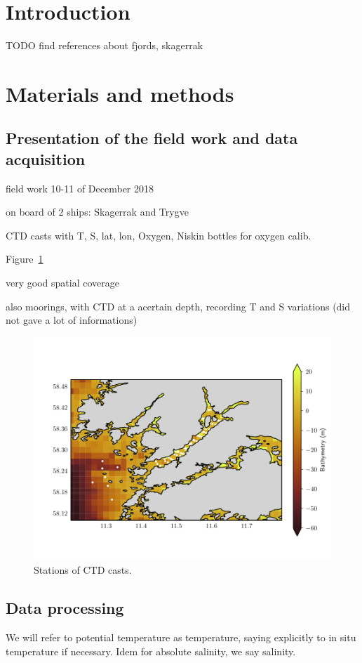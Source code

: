 \documentclass[12pt,a4paper]{article}
\begin{document}
\newpage

\section{\label{sec_intro}Introduction}

TODO find references about fjords, skagerrak

\section{Materials and methods}
\subsection{Presentation of the field work and data acquisition}

field work 10-11 of December 2018

on board of 2 ships: Skagerrak and Trygve

CTD casts with T, S, lat, lon, Oxygen, Niskin bottles for oxygen calib.

Figure~\ref{fig:stations}

very good spatial coverage

also moorings, with CTD at a acertain depth, recording T and S variations (did not
gave a lot of informations)

\begin{figure}
  \centering
  \includegraphics{stations}
  \caption{\label{fig:stations}Stations of CTD casts.}
\end{figure}

\subsection{Data processing}
We will refer to potential temperature as temperature, saying
explicitly to in situ temperature if necessary.
Idem for absolute salinity, we say salinity.
\end{document}
